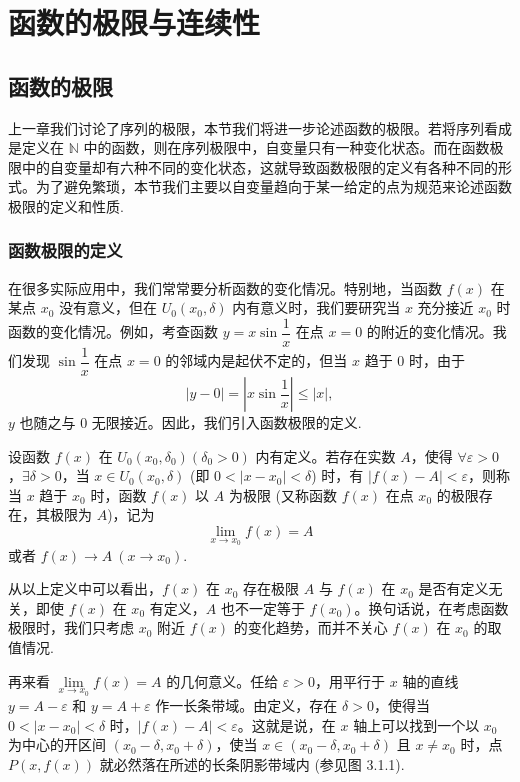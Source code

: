 \setcounter{chapter}{2} %
\chapter{函数的极限与连续性}
\label{chap:ma-3}

\section{函数的极限}
\label{sec:ma-3-1}

上一章我们讨论了序列的极限，本节我们将进一步论述函数的极限。若将序列看成是定义在 $\mathbb{N}$ 中的函数，则在序列极限中，自变量只有一种变化状态。而在函数极限中的自变量却有六种不同的变化状态，这就导致函数极限的定义有各种不同的形式。为了避免繁琐，本节我们主要以自变量趋向于某一给定的点为规范来论述函数极限的定义和性质.

\subsection{函数极限的定义}
\label{subsec:ma-3-1-1}

在很多实际应用中，我们常常要分析函数的变化情况。特别地，当函数 $f(x)$ 在某点 $x_0$ 没有意义，但在 $U_0(x_0,\delta)$ 内有意义时，我们要研究当 $x$ 充分接近 $x_0$ 时函数的变化情况。例如，考查函数 $y=x\sin\dfrac1x$ 在点 $x=0$ 的附近的变化情况。我们发现 $\sin\dfrac1x$ 在点 $x=0$ 的邻域内是起伏不定的，但当 $x$ 趋于 $0$ 时，由于
\[
  |y-0|=\left|x\sin\frac1x\right|\leqslant |x|,
\]
$y$ 也随之与 $0$ 无限接近。因此，我们引入函数极限的定义.

\begin{definition}\label{definition:ma-3-1-1}
设函数 $f(x)$ 在 $U_0(x_0,\delta_0)(\delta_0>0)$ 内有定义。若存在实数 $A$，使得 $\forall\varepsilon>0$，$\exists\delta>0$，当 $x\in U_0(x_0,\delta)$ (即 $0<|x-x_0|<\delta$) 时，有 $|f(x)-A|<\varepsilon$，则称当 $x$ 趋于 $x_0$ 时，函数 $f(x)$ 以 $A$ 为极限 (又称函数 $f(x)$ 在点 $x_0$ 的极限存在，其极限为 $A$)，记为
\[
  \lim_{x\to x_0} f(x)=A
\]
或者 $f(x)\to A\ (x\to x_0)$.
\end{definition}

从以上定义中可以看出，$f(x)$ 在 $x_0$ 存在极限 $A$ 与 $f(x)$ 在 $x_0$ 是否有定义无关，即使 $f(x)$ 在 $x_0$ 有定义，$A$ 也不一定等于 $f(x_0)$。换句话说，在考虑函数极限时，我们只考虑 $x_0$ 附近 $f(x)$ 的变化趋势，而并不关心 $f(x)$ 在 $x_0$ 的取值情况.

再来看 $\lim\limits_{x\to x_0} f(x)=A$ 的几何意义。任给 $\varepsilon>0$，用平行于 $x$ 轴的直线 $y=A-\varepsilon$ 和 $y=A+\varepsilon$ 作一长条带域。由定义，存在 $\delta>0$，使得当 $0<|x-x_0|<\delta$ 时，$|f(x)-A|<\varepsilon$。这就是说，在 $x$ 轴上可以找到一个以 $x_0$ 为中心的开区间 $(x_0-\delta,x_0+\delta)$，使当 $x\in(x_0-\delta,x_0+\delta)$ 且 $x\ne x_0$ 时，点 $P(x,f(x))$ 就必然落在所述的长条阴影带域内 (参见图 3.1.1).

